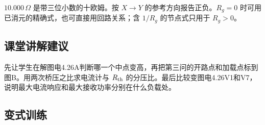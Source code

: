 \documentclass[UTF8,fontset=fandol,a4paper,11pt]{ctexart}
\begin{document}
$10.000\,\Omega$ 是带三位小数的十欧姆。按 $X\to Y$ 的参考方向报告正负。$R_g=0$ 时可用已消元的精确式，也可直接用回路关系；含 $1/R_g$ 的节点式只用于 $R_g>0$。



\subsection*{课堂讲解建议}

先让学生在解图电4.26A判断哪一个中点变高，再把第三问的开路点和加载点标到图B。用两次桥压之比求电流计与 $R_{\rm th}$ 的分压比。最后比较变图电4.26V1和V7，说明最大电流响应和最大接收功率分别在什么负载处。


\subsection*{变式训练}
\end{document}
